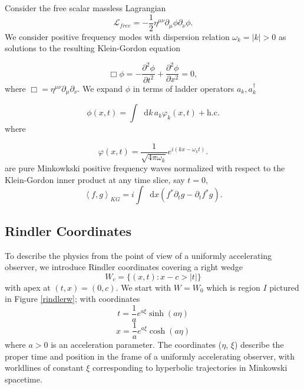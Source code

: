 \documentclass[12pt,a4paper]{article}
\newcommand*\diff{\mathop{}\!\mathrm{d}}
\begin{document}
Consider the free scalar massless Lagrangian
\begin{equation}
\mathscr{L}_{free} = -\frac{1}{2} \eta^{\mu\nu}\partial_\mu \phi \partial_\nu \phi.
\end{equation}
We consider positive frequency modes with dispersion relation $\omega_k = |k| > 0$ as solutions to the resulting Klein-Gordon equation 

\begin{equation}
  \Box \phi = -\frac{\partial^2 \phi}{\partial t^2} + \frac{\partial^2 \phi}{\partial x^2} = 0,
 \label{massless-wave-eq}
\end{equation}
where $\Box = \eta^{\mu\nu} \partial_\mu \partial_\nu$. We expand $\phi$ in terms of ladder operators $a_k, a_k^\dagger$

\begin{equation}
  \phi(x,t) = \int \diff k \, a_k \varphi_k(x,t) + \text{h.c.}
\end{equation}
where

\begin{equation}
  \varphi(x,t) = \frac{1}{\sqrt{4\pi\omega_k}} e^{i(kx - \omega_k t)}.
\label{amode}
\end{equation}
are pure Minkowkski positive frequency waves normalized with respect to the Klein-Gordon inner product at any time slice, say $t = 0$,
\begin{equation}
  \left<f, g\right>_{KG} = i \int \diff x (f^* \partial_t g - \partial_t f^* g).
\end{equation}

\subsection{Rindler Coordinates}

To describe the physics from the point of view of a uniformly accelerating observer, we introduce Rindler coordinates covering a right wedge 
\begin{equation}
  W_c = \{(x,t) : x-c>|t|\}
\end{equation}
with apex at $(t,x)=(0,c)$.  We start with $W = W_0$ which is region $I$ pictured in Figure \ref{rindlerw}; with coordinates
\begin{equation}
  t = \frac{1}{a}e^{a\xi}\sinh{(a\eta)}
\label{sinh}
\end{equation}
\begin{equation}
x = \frac{1}{a}e^{a\xi}\cosh{(a\eta)}
\end{equation}
where $a>0$ is an acceleration parameter. The coordinates ($\eta$, $\xi$) describe the proper time and position in the frame of a uniformly accelerating observer, with worldlines of constant $\xi$ corresponding to hyperbolic trajectories in Minkowski spacetime.
\end{document}
